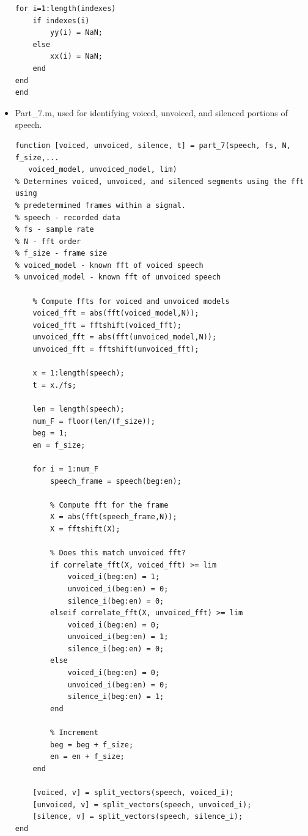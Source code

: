 \documentclass[11pt]{article}
\begin{document}
\begin{itemize}
\begin{lstlisting}
for i=1:length(indexes)
    if indexes(i)
        yy(i) = NaN;
    else
        xx(i) = NaN;
    end
end
end
\end{lstlisting}


\item Part\_7.m, used for identifying voiced, unvoiced, and silenced portions of speech.
\begin{lstlisting}
function [voiced, unvoiced, silence, t] = part_7(speech, fs, N, f_size,...
   voiced_model, unvoiced_model, lim)
% Determines voiced, unvoiced, and silenced segments using the fft using
% predetermined frames within a signal.
% speech - recorded data
% fs - sample rate
% N - fft order
% f_size - frame size
% voiced_model - known fft of voiced speech
% unvoiced_model - known fft of unvoiced speech
    
    % Compute ffts for voiced and unvoiced models
    voiced_fft = abs(fft(voiced_model,N));
    voiced_fft = fftshift(voiced_fft);
    unvoiced_fft = abs(fft(unvoiced_model,N));
    unvoiced_fft = fftshift(unvoiced_fft);
    
    x = 1:length(speech);
    t = x./fs;

    len = length(speech);
    num_F = floor(len/(f_size));
    beg = 1;
    en = f_size;

    for i = 1:num_F
        speech_frame = speech(beg:en);

        % Compute fft for the frame
        X = abs(fft(speech_frame,N));
        X = fftshift(X);
        
        % Does this match unvoiced fft?
        if correlate_fft(X, voiced_fft) >= lim
            voiced_i(beg:en) = 1;
            unvoiced_i(beg:en) = 0;
            silence_i(beg:en) = 0;
        elseif correlate_fft(X, unvoiced_fft) >= lim
            voiced_i(beg:en) = 0;
            unvoiced_i(beg:en) = 1;
            silence_i(beg:en) = 0;
        else
            voiced_i(beg:en) = 0;
            unvoiced_i(beg:en) = 0;
            silence_i(beg:en) = 1;
        end

        % Increment
        beg = beg + f_size;
        en = en + f_size;
    end

    [voiced, v] = split_vectors(speech, voiced_i); 
    [unvoiced, v] = split_vectors(speech, unvoiced_i); 
    [silence, v] = split_vectors(speech, silence_i);
end
\end{lstlisting}


\end{itemize}
\end{document}
